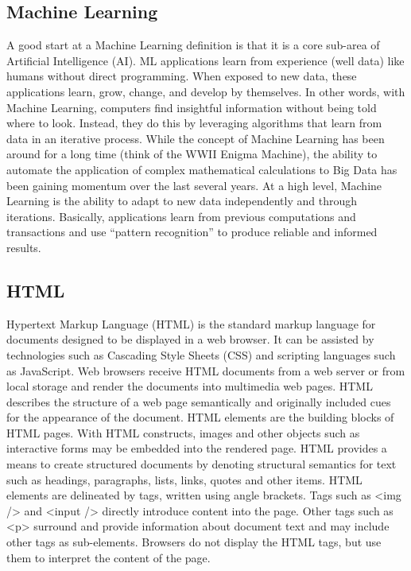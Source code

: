 \documentclass[oneside,12pt]{Classes/VTU}
\begin{document}
	\subsection{Machine Learning}
	A good start at a Machine Learning definition is that it is a core sub-area of Artificial Intelligence (AI). ML applications learn from experience (well data) like humans without direct programming. When exposed to new data, these applications learn, grow, change, and develop by themselves. In other words, with Machine Learning, computers find insightful information without being told where to look. Instead, they do this by leveraging algorithms that learn from data in an iterative process.
While the concept of Machine Learning has been around for a long time (think of the WWII Enigma Machine), the ability to automate the application of complex mathematical calculations to Big Data has been gaining momentum over the last several years.
At a high level, Machine Learning is the ability to adapt to new data independently and through iterations.  Basically, applications learn from previous computations and transactions and use “pattern recognition” to produce reliable and informed results.

	\subsection{HTML}
	Hypertext Markup Language (HTML) is the standard markup language for documents designed to be displayed in a web browser. It can be assisted by technologies such as Cascading Style Sheets (CSS) and scripting languages such as JavaScript.
Web browsers receive HTML documents from a web server or from local storage and render the documents into multimedia web pages. HTML describes the structure of a web page semantically and originally included cues for the appearance of the document.
HTML elements are the building blocks of HTML pages. With HTML constructs, images and other objects such as interactive forms may be embedded into the rendered page. HTML provides a means to create structured documents by denoting structural semantics for text such as headings, paragraphs, lists, links, quotes and other items. HTML elements are delineated by tags, written using angle brackets. Tags such as <img /> and <input /> directly introduce content into the page. Other tags such as <p> surround and provide information about document text and may include other tags as sub-elements. Browsers do not display the HTML tags, but use them to interpret the content of the page.
\end{document}

